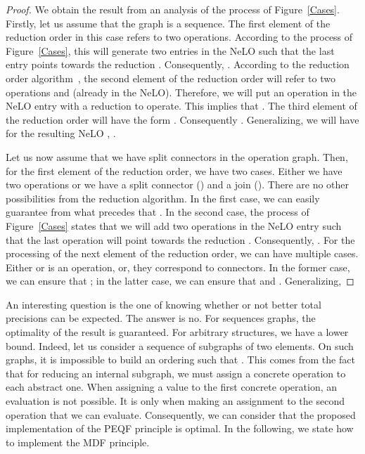\documentclass[a4paper]{article}
\begin{document}
\begin{proof}

We obtain the result from an analysis of the process of Figure~\ref{Cases}. Firstly, let us assume that 
the graph is a sequence. 
The first element  of the reduction order in this case refers to two operations. 
According to the process of Figure~\ref{Cases}, this will generate two entries in the NeLO such that the 
last entry points towards the reduction . Consequently, . According to 
the reduction order algorithm~\cite{GoldmanNgoko}, the second element  of the reduction order will refer to two 
operations  and  (already in the NeLO). Therefore, we will put an operation in the NeLO entry with a reduction to operate. 
This implies that . The third element of the reduction order will have the form . 
Consequently . Generalizing, we will have for the resulting NeLO , 
. 

Let us now assume that we have split connectors in the operation graph. Then, for the first element  of the reduction order, we have two cases. Either we have two operations or we have a split connector () and a join (). 
There are no other possibilities from the reduction algorithm. In the first case, we can easily guarantee from what 
precedes that . In the second case, the process of Figure~\ref{Cases} states that we will 
add two operations in the NeLO entry such that the last operation will point towards the reduction . Consequently, 
 . For the processing of the next element  of the reduction order, we can have multiple cases. Either 
 or  is an operation, or, they correspond to connectors. In the former case, we can ensure that ; 
in the latter case, we can ensure that  and . Generalizing, 


\end{proof}

An interesting question is the one of knowing whether or not better total precisions can be expected. 
The answer is no. For sequences graphs, the optimality of the result is guaranteed. For arbitrary structures, we have a lower 
bound. Indeed, let us consider a sequence of subgraphs of two elements. On such graphs, it is impossible to build an ordering 
 such that . This comes from the fact that for reducing an internal subgraph, 
we must assign a concrete operation to each abstract one. When assigning a value to the first concrete operation, an evaluation is not possible. It is only when making 
an assignment to the second operation that we can evaluate.  Consequently, we can consider that the proposed implementation of the 
PEQF principle is optimal. In the following, we state how to implement the MDF principle. 
\end{document}
